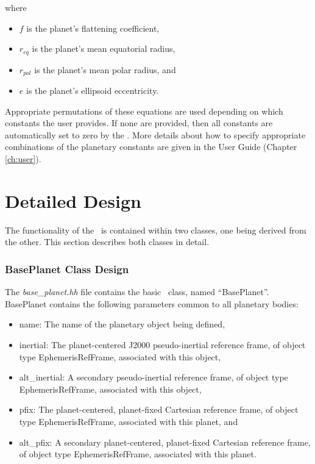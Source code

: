 where
\begin{itemize}
\item $f$ is the planet's flattening coefficient,
\item $r_{eq}$ is the planet's mean equatorial radius,
\item $r_{pol}$ is the planet's mean polar radius, and
\item $e$ is the planet's ellipsoid eccentricity.
\end{itemize}

Appropriate permutations of these equations are used depending on which
constants the user provides.  If none are provided, then all constants are
automatically set to zero by the \planetDesc.  More details about how to
specify appropriate combinations of the planetary constants
are given in the User Guide (Chapter \ref{ch:user}).


\section{Detailed Design}

The functionality of the \planetDesc\ is contained within two classes, one
being derived from the other. This section describes both classes in detail.

\subsubsection{BasePlanet Class Design}

The {\em base\_planet.hh} file contains the basic \planetDesc\ class, named
``BasePlanet''.  BasePlanet contains the following parameters common to all
planetary bodies:

\begin{itemize}
\item{name:} The name of the planetary object being defined,

\item{inertial:} The planet-centered J2000 pseudo-inertial reference frame, of
object type EphemerisRefFrame, associated with this object,

\item{alt\_inertial:} A secondary pseudo-inertial reference frame, of
object type EphemerisRefFrame, associated with this object,

\item{pfix:} The planet-centered, planet-fixed Cartesian reference frame, of
object type EphemerisRefFrame, associated with this planet, and

\item{alt\_pfix:} A secondary planet-centered, planet-fixed Cartesian
reference frame, of object type EphemerisRefFrame, associated with this planet.
\end{itemize}

